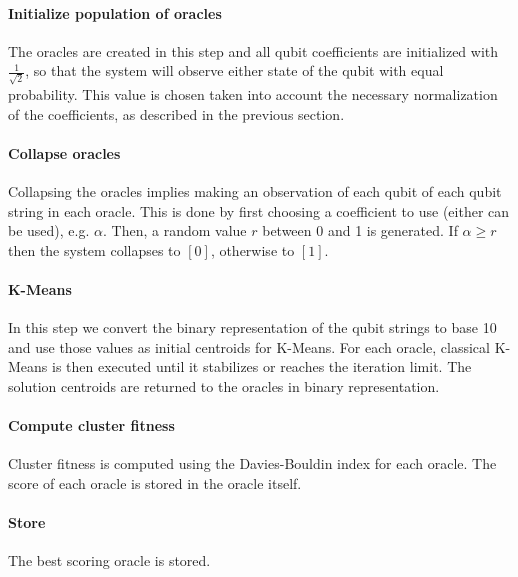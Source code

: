 \paragraph{Initialize population of oracles}

The oracles are created in this step and all qubit coefficients are initialized with $\frac{1}{\sqrt{2}}$, so that the system will observe either state of the qubit with equal probability.
This value is chosen taken into account the necessary normalization of the coefficients, as described in the previous section.

\paragraph{Collapse oracles}

Collapsing the oracles implies making an observation of each qubit of each qubit string in each oracle.
This is done by first choosing a coefficient to use (either can be used), e.g. $\alpha$.
Then, a random value $r$ between 0 and 1 is generated.
If $\alpha \ge r$ then the system collapses to $[0]$, otherwise to $[1]$.

\paragraph{K-Means}
In this step we convert the binary representation of the qubit strings to base 10 and use those values as initial centroids for K-Means.
For each oracle, classical K-Means is then executed until it stabilizes or reaches the iteration limit.
The solution centroids are returned to the oracles in binary representation.

\paragraph{Compute cluster fitness}
Cluster fitness is computed using the Davies-Bouldin index for each oracle.
The score of each oracle is stored in the oracle itself.

\paragraph{Store}
The best scoring oracle is stored.

